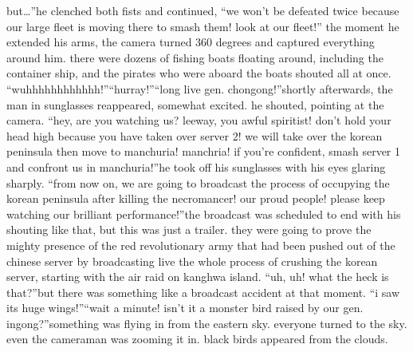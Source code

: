  but…”he clenched both fists and continued, “we won’t be defeated twice because our large fleet is moving there to smash them! look at our fleet!”
the moment he extended his arms, the camera turned 360 degrees and captured everything around him.
there were dozens of fishing boats floating around, including the container ship, and the pirates who were aboard the boats shouted all at once.
“wuhhhhhhhhhhhh!”“hurray!”“long live gen.
 chongong!”shortly afterwards, the man in sunglasses reappeared, somewhat excited.
he shouted, pointing at the camera.
“hey, are you watching us? leeway, you awful spiritist! don’t hold your head high because you have taken over server 2! we will take over the korean peninsula then move to manchuria! manchria! if you’re confident, smash server 1 and confront us in manchuria!”he took off his sunglasses with his eyes glaring sharply.
“from now on, we are going to broadcast the process of occupying the korean peninsula after killing the necromancer! our proud people! please keep watching our brilliant performance!”the broadcast was scheduled to end with his shouting like that, but this was just a trailer.
they were going to prove the mighty presence of the red revolutionary army that had been pushed out of the chinese server by broadcasting live the whole process of crushing the korean server, starting with the air raid on kanghwa island.
“uh, uh! what the heck is that?”but there was something like a broadcast accident at that moment.
“i saw its huge wings!”“wait a minute! isn’t it a monster bird raised by our gen.
 ingong?”something was flying in from the eastern sky.
 everyone turned to the sky.
 even the cameraman was zooming it in.
 black birds appeared from the clouds.

